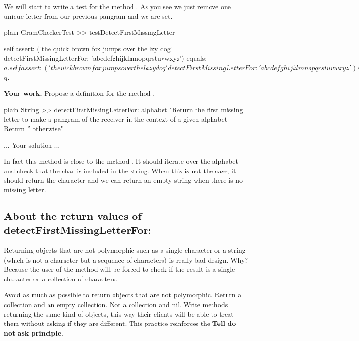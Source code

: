 \documentclass[10pt,twoside,english]{_support/latex/sbabook/sbabook}
\begin{document}
We will start to write a test for the method . As you see we just remove one unique letter from our previous pangram and we are set.

\begin{displaycode}{plain}
GramCheckerTest >> testDetectFirstMissingLetter

	self assert: ('the quick brown fox jumps over the lzy dog' 
		detectFirstMissingLetterFor: 'abcdefghijklmnopqrstuvwxyz') equals: $a.
	self assert: ('the uick brown fox jumps over the lazy dog' 
		detectFirstMissingLetterFor: 'abcdefghijklmnopqrstuvwxyz') equals: $q.
\end{displaycode}

\textbf{Your work:} Propose a definition for the method .

\begin{displaycode}{plain}
String >> detectFirstMissingLetterFor: alphabet
	"Return the first missing letter to make a pangram of the receiver in the context of a given alphabet. 
	Return '' otherwise"
	
	... Your solution ...
	
\end{displaycode}

In fact this method is close to the method .  It should iterate over the alphabet and check that the char is included in the string. When this is not the case, it should return the character and we can return an empty string when there is no missing letter. 
\subsection{About the return values of detectFirstMissingLetterFor:}
Returning objects that are not polymorphic such as a single character or a string (which is not a character but a sequence of characters) is really bad design. 
Why? Because the user of the method will be forced to check if the result is a single character or a collection of characters.

\begin{coffee}
Avoid as much as possible to return objects that are not polymorphic. Return a collection and an empty collection. Not a collection and nil. Write methods returning the same kind of objects, this way their clients will be able to treat them without asking if they are different. This practice reinforces the \textbf{Tell do not ask principle}.
\end{coffee}
\end{document}
